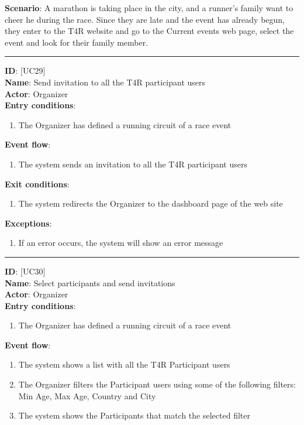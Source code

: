 \documentclass[hidelinks, 12pt]{report}
\newcommand\usecase[1]{ [UC#1] }
\begin{document}
\begin{itemize}
		\textbf{Scenario}: A marathon is taking place in the city, and a runner's family want to cheer he during the race. Since they are late and the event has already begun, they enter to the T4R website and go to the Current events web page, select the event and look for their family member. \\
		\rule{\linewidth}{0.4pt}
		\textbf{ID}: \usecase{29} \\
		\textbf{Name}: Send invitation to all the T4R participant users \\
		\textbf{Actor}: Organizer \\
		\textbf{Entry conditions}:
		\begin{enumerate}
			\item{The Organizer has defined a running circuit of a race event}
		\end{enumerate}
		\textbf{Event flow}:
		\begin{enumerate}
			\item{The system sends an invitation to all the T4R participant users}
		\end{enumerate}
		\textbf{Exit conditions}:
		\begin{enumerate}
			\item{The system redirects the Organizer to the dashboard page of the web site}
		\end{enumerate}
		\textbf{Exceptions}:
		\begin{enumerate}
			\item{If an error occurs, the system will show an error message}
		\end{enumerate}
		\rule{\linewidth}{0.4pt}
		\textbf{ID}: \usecase{30} \\
		\textbf{Name}: Select participants and send invitations \\
		\textbf{Actor}: Organizer \\
		\textbf{Entry conditions}:
		\begin{enumerate}
			\item{The Organizer has defined a running circuit of a race event}
		\end{enumerate}
		\textbf{Event flow}:
		\begin{enumerate}
			\item{The system shows a list with all the T4R Participant users}
			\item{The Organizer filters the Participant users using some of the following filters: Min Age, Max Age, Country and City}
			\item{The system shows the Participants that match the selected filter}

\end{enumerate}
\end{itemize}
\end{document}
